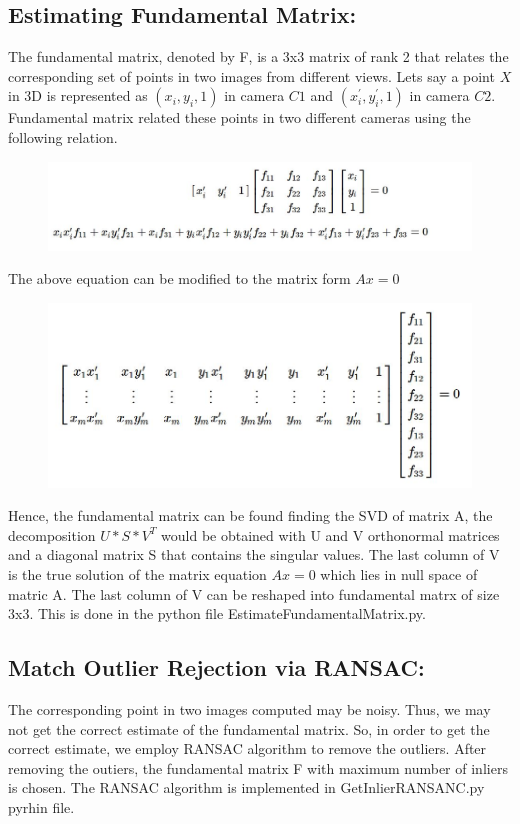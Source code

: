\documentclass[12pt]{article}
\begin{document}
\subsection{Estimating Fundamental Matrix:}The fundamental matrix, denoted by F, is a 3x3 matrix of rank 2 that relates the corresponding set of points in two images from different views. Lets say a point $X$ in 3D is represented as $(x_i, y_i, 1)$ in camera $C1$ and $(x^{'}_i, y^{'}_i, 1)$ in camera $C2$. Fundamental matrix related these points in two different cameras using the following relation.
\newpage
\begin{figure}[h]
    \centering
    \includegraphics[width=13cm]{FM}
\end{figure}
The above equation can be modified to the matrix form $Ax = 0$
\begin{figure}[h]
    \centering
    \includegraphics[width=13cm]{FM2}
\end{figure}
Hence, the fundamental matrix can be found finding the SVD of matrix A, the decomposition $U*S*V^T$ would be obtained with U and V orthonormal matrices and a diagonal matrix S that contains the singular values. The last column of V is the true solution of the matrix equation $Ax = 0$ which lies in null space of matric A. The last column of V can be reshaped into fundamental matrx of size 3x3. This is done in the python file EstimateFundamentalMatrix.py.

\subsection{Match Outlier Rejection via RANSAC:}
The corresponding point in two images computed may be noisy. Thus, we may not get the correct estimate of the fundamental matrix. So, in order to get the correct estimate, we employ RANSAC algorithm to remove the outliers. After removing the outiers, the fundamental matrix F with maximum number of inliers is chosen. The RANSAC algorithm is implemented in GetInlierRANSANC.py pyrhin file.
\end{document}
